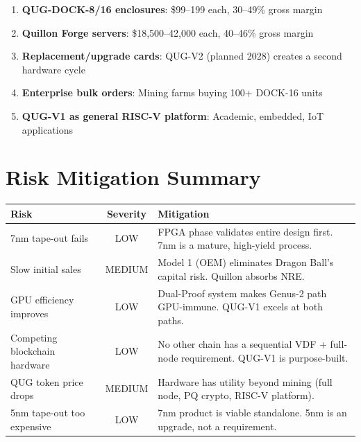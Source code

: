\documentclass[11pt,a4paper]{article}
\begin{document}
\begin{enumerate}[leftmargin=1.5em]
    \item \textbf{QUG-DOCK-8/16 enclosures}: \$99--199 each, 30--49\% gross margin
    \item \textbf{Quillon Forge servers}: \$18,500--42,000 each, 40--46\% gross margin
    \item \textbf{Replacement/upgrade cards}: QUG-V2 (planned 2028) creates a second hardware cycle
    \item \textbf{Enterprise bulk orders}: Mining farms buying 100+ DOCK-16 units
    \item \textbf{QUG-V1 as general RISC-V platform}: Academic, embedded, IoT applications
\end{enumerate}


\section{Risk Mitigation Summary}

\begin{center}
\begin{tabular}{@{}p{4cm}cp{7.5cm}@{}}
\toprule
\textbf{Risk} & \textbf{Severity} & \textbf{Mitigation} \\
\midrule
7nm tape-out fails & LOW & FPGA phase validates entire design first. 7nm is a mature, high-yield process. \\
Slow initial sales & MEDIUM & Model 1 (OEM) eliminates Dragon Ball's capital risk. Quillon absorbs NRE. \\
GPU efficiency improves & LOW & Dual-Proof system makes Genus-2 path GPU-immune. QUG-V1 excels at both paths. \\
Competing blockchain hardware & LOW & No other chain has a sequential VDF + full-node requirement. QUG-V1 is purpose-built. \\
QUG token price drops & MEDIUM & Hardware has utility beyond mining (full node, PQ crypto, RISC-V platform). \\
5nm tape-out too expensive & LOW & 7nm product is viable standalone. 5nm is an upgrade, not a requirement. \\
\bottomrule
\end{tabular}
\end{center}


\end{document}
